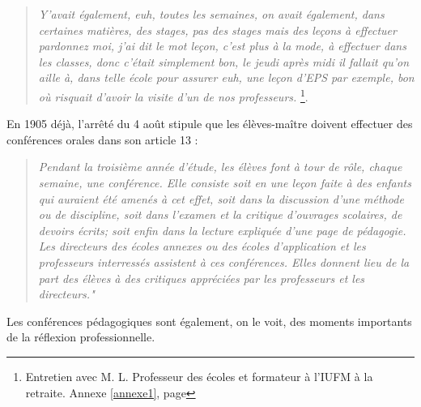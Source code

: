 \documentclass[a4paper,11pt]{article}
\begin{document}
			\begin{quote}
			 \emph{Y'avait également, euh, toutes les semaines, on avait également, dans certaines matières, des stages, pas des stages mais des leçons à effectuer pardonnez moi, j'ai dit le mot leçon, c'est plus à la mode, à effectuer dans les classes, donc c'était simplement bon, le jeudi après midi il fallait qu'on aille à, dans telle école pour assurer euh, une leçon d'EPS par exemple, bon où risquait d'avoir la visite d'un de nos professeurs.} \footnote{Entretien avec M. L. Professeur des écoles et formateur à l'IUFM à la retraite. Annexe \ref{annexe1}, page \pageref{annexe1}}. 
			\end{quote}
			 En 1905 déjà, l'arrêté du 4 août stipule que les élèves-maître doivent effectuer des conférences orales dans son article 13 :
			 \begin{quote}
			  \emph{Pendant la troisième année d'étude, les élèves font à tour de rôle, chaque semaine, une conférence. Elle consiste soit en une leçon faite à des enfants qui auraient été amenés à cet effet, soit dans la discussion d'une méthode ou de discipline, soit dans l'examen et la critique d'ouvrages scolaires, de devoirs écrits; soit enfin dans la lecture expliquée d'une page de pédagogie. Les directeurs des écoles annexes ou des écoles d'application et les professeurs interressés assistent à ces conférences. Elles donnent lieu de la part des élèves à des critiques appréciées par les professeurs et les directeurs."}
			 \end{quote}
			  Les conférences pédagogiques sont également, on le voit, des moments importants de la réflexion professionnelle.
\end{document}
